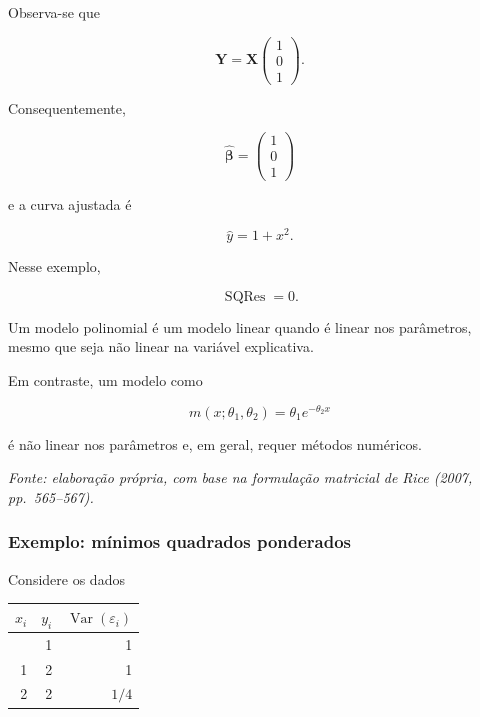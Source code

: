 \documentclass[
  letterpaper,
  DIV=11,
  numbers=noendperiod]{scrreprt}
\begin{document}
Observa-se que

\[\mathbf{Y}
=
\mathbf{X}
\begin{pmatrix}
1\\
0\\
1
\end{pmatrix}.\]

Consequentemente,

\[\widehat{\boldsymbol\beta}
=
\begin{pmatrix}
1\\
0\\
1
\end{pmatrix}\]

e a curva ajustada é

\[\widehat y
=
1+x^2.\]

Nesse exemplo,

\[\operatorname{SQRes}=0.\]

\begin{tcolorbox}[enhanced jigsaw, colback=white, leftrule=.75mm, colbacktitle=quarto-callout-note-color!10!white, breakable, titlerule=0mm, bottomtitle=1mm, title=\textcolor{quarto-callout-note-color}{\faInfo}\hspace{0.5em}{Observação}, colframe=quarto-callout-note-color-frame, toprule=.15mm, opacityback=0, bottomrule=.15mm, opacitybacktitle=0.6, arc=.35mm, toptitle=1mm, rightrule=.15mm, coltitle=black, left=2mm]

Um modelo polinomial é um modelo linear quando é linear nos parâmetros,
mesmo que seja não linear na variável explicativa.

Em contraste, um modelo como

\[m(x;\theta_1,\theta_2)
=
\theta_1e^{-\theta_2x}\]

é não linear nos parâmetros e, em geral, requer métodos numéricos.

\end{tcolorbox}

\emph{Fonte: elaboração própria, com base na formulação matricial de
Rice (2007, pp.~565--567).}

\subsubsection{Exemplo: mínimos quadrados
ponderados}\label{exemplo-muxednimos-quadrados-ponderados}

Considere os dados

\begin{longtable}[]{@{}rrr@{}}
\toprule\noalign{}
\(x_i\) & \(y_i\) & \(\operatorname{Var}(\varepsilon_i)\) \\
\midrule\noalign{}
\endhead
\bottomrule\noalign{}
\endlastfoot
0 & 1 & 1 \\
1 & 2 & 1 \\
2 & 2 & \(1/4\) \\
\end{longtable}
\end{document}
